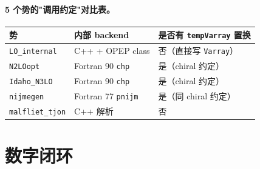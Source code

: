 \paragraph{5 个势的"调用约定"对比表。}
\begin{center}
\begin{tabular}{lll}
\toprule
势 & 内部 backend & 是否有 \texttt{tempVarray} 置换 \\
\midrule
\texttt{LO\_internal} & C++ + OPEP class & 否（直接写 \texttt{Varray}） \\
\texttt{N2LOopt} & Fortran 90 \texttt{chp} & 是（chiral 约定） \\
\texttt{Idaho\_N3LO} & Fortran 90 \texttt{chp} & 是（chiral 约定） \\
\texttt{nijmegen} & Fortran 77 \texttt{pnijm} & 是（同 chiral 约定） \\
\texttt{malfliet\_tjon} & C++ 解析 & 否 \\
\bottomrule
\end{tabular}
\end{center}

\section{数字闭环}
\label{sec:ch08-numerics}

